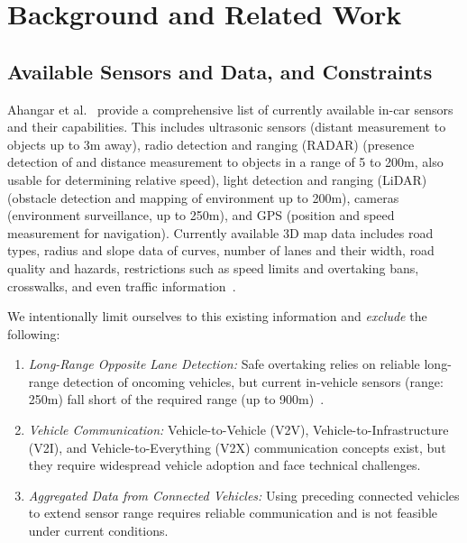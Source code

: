 \section{Background and Related Work}
\label{ref:relwork}
	\subsection{Available Sensors and Data, and Constraints}\label{subsec:sensors-available}
	Ahangar et al.~\cite{Ahangar2021} provide a comprehensive list of currently available in-car sensors and their capabilities. 
	This includes 
	ultrasonic sensors (distant measurement to objects up to 3m away), radio detection and ranging (RADAR) (presence detection of and distance measurement to objects in a range of 5 to 200m, also usable for determining relative speed), light detection and ranging (LiDAR) (obstacle detection and mapping of environment up to 200m), cameras (environment surveillance, up to 250m), and GPS (position and speed measurement for navigation). 
	Currently available 3D map data includes road types, radius and slope data of curves, number of lanes and their width, road quality and hazards, restrictions such as speed limits and overtaking bans, crosswalks, and even traffic information~\cite{trafficData, DynamicPassPrediction}. 
	
	
	We intentionally limit ourselves to this existing information and %
	\textit{exclude} the following: 
	\begin{enumerate}
		\item \textit{Long-Range Opposite Lane Detection:} 
		Safe overtaking relies on reliable long-range detection of oncoming vehicles, but current in-vehicle sensors (range: 250m) fall short of the required range (up to 900m)~\cite{NCHRP_NAP23278}.
		\label{enum:constraints:range}
		
		\item \textit{Vehicle Communication:} Vehicle-to-Vehicle (V2V), Vehicle-to-Infrastructure (V2I), and Vehicle-to-Everything (V2X) communication concepts exist, but they require widespread vehicle adoption and face technical challenges. 
		
		\item \textit{Aggregated Data from Connected Vehicles:} Using preceding connected vehicles to extend sensor range requires reliable communication and is not feasible under current conditions.
	\end{enumerate}
	
	
	

